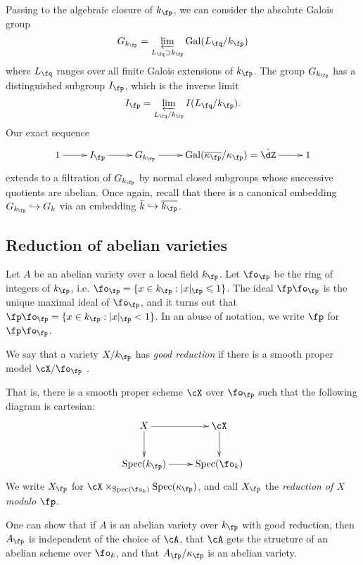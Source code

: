 Passing to the algebraic closure of $k_\fp$, we can consider the absolute 
Galois group 
\[
  G_{k_\fp} = \varprojlim_{L_\fq\supset k_\fp} \gal(L_\fq/k_\fp)
\]
where $L_\fq$ ranges over all finite Galois extensions of $k_\fp$. The group 
$G_{k_\fp}$ has a distinguished subgroup $I_\fp$, which is the inverse limit 
\[
  I_\fp = \varprojlim_{L_\fq/k_\fp} I(L_\fq/k_\fp) \text{.}
\]
Our exact sequence 
\[\xymatrix{
  1 \ar[r] 
    & I_\fp \ar[r] 
    & G_{k_\fp} \ar[r] 
    & \gal(\overline{\kappa_\fp}/\kappa_\fp) =\hat\dZ \ar[r] 
    & 1
}\]
extends to a filtration of $G_{k_\fp}$ by normal closed subgroups whose 
successive quotients are abelian. Once again, recall that there is a canonical 
embedding $G_{k_\fp}\hookrightarrow G_k$ via an embedding 
$\bar k\hookrightarrow \overline{k_\fp}$. 










\subsection{Reduction of abelian varieties}

Let $A$ be an abelian variety over a local field $k_\fp$. Let $\fo_\fp$ be the 
ring of integers of $k_\fp$, i.e. $\fo_\fp=\{x\in k_\fp:|x|_\fp\leqslant 1\}$. 
The ideal $\fp\fo_\fp$ is the unique maximal ideal of $\fo_\fp$, and it turns 
out that $\fp\fo_\fp = \{x\in k_\fp:|x|_\fp<1\}$. In an abuse of notation, we 
write $\fp$ for $\fp\fo_\fp$. 

\begin{definition}
We say that a variety $X/k_\fp$ has \emph{good reduction} if there is a smooth 
proper model $\cX/\fo_\fp$ .
\end{definition}
That is, there is a smooth proper scheme $\cX$ over $\fo_\fp$ such that the 
following diagram is cartesian:
\[\xymatrix{
  X \ar[r] \ar[d]  
    & \cX \ar[d] \\
  \spec(k_\fp) \ar[r] 
    & \spec(\fo_k)
}\]
We write $X_\fp$ for $\cX\times_{\spec(\fo_k)}\spec(\kappa_\fp)$, and call 
$X_\fp$ the \emph{reduction of $X$ modulo $\fp$}. 

One can show that if $A$ is an abelian variety over $k_\fp$ with good 
reduction, then $A_\fp$ is independent of the choice of $\cA$, that $\cA$ gets 
the structure of an abelian scheme over $\fo_k$, and that $A_\fp/\kappa_\fp$ is 
an abelian variety. 

